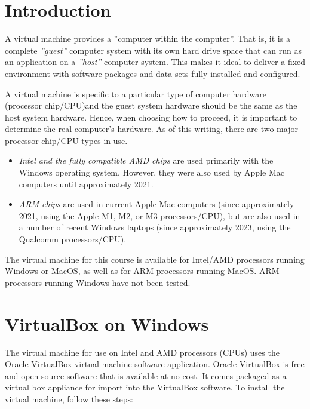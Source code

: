 
\section{Introduction}

A virtual machine provides a ''computer within the computer''. That is, it is a complete \emph{''guest''} computer system with its own hard drive space that can run as an application on a \emph{''host''} computer system. This makes it ideal to deliver a fixed environment with software packages and data sets fully installed and configured. 

A virtual machine is specific to a particular type of computer hardware (processor chip/CPU)and the guest system hardware should be the same as the host system hardware. Hence, when choosing how to proceed, it is important to determine the real computer's hardware. As of this writing, there are two major processor chip/CPU types in use.

\begin{itemize}
\item \emph{Intel and the fully compatible AMD chips} are used primarily with the Windows operating system. However, they were also used by Apple Mac computers until approximately 2021. 
\item \emph{ARM chips} are used in current Apple Mac computers (since approximately 2021, using the Apple M1, M2, or M3 processors/CPU), but are also used in a number of recent Windows laptops (since approximately 2023, using the Qualcomm processors/CPU). 
\end{itemize}

The virtual machine for this course is available for Intel/AMD processors running Windows or MacOS, as well as for ARM processors running MacOS. ARM processors running Windows have not been tested. 

\section{VirtualBox on Windows}

The virtual machine for use on Intel and AMD processors (CPUs) uses the Oracle VirtualBox virtual machine software application. Oracle VirtualBox is free and open-source software that is available at no cost. It comes packaged as a virtual box appliance for import into the VirtualBox software. To install the virtual machine, follow these steps:

